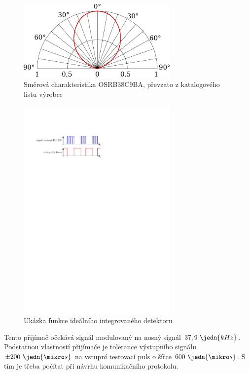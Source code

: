 \begin{figure}[H]
    \begin{center}
        \includegraphics[width=0.7\textwidth]{img/OSRB38C9BA-direction}
    \end{center}
    \caption{Směrová charakteristika OSRB38C9BA, převzato z katalogového listu výrobce}
\end{figure}

\begin{figure}[H]
    \begin{center}
        \includegraphics[width=0.7\textwidth]{img/funkce-ir-detektoru}
    \end{center}
    \caption{Ukázka funkce ideálního integrovaného detektoru}
\end{figure}

Tento přijímač očekává signál modulovaný na nosný signál $37,9~\jedn{kHz}$. Podstatnou vlastností přijímače je tolerance výstupního signálu $\pm 200~\jedn{\mikro s}$ na vstupní testovací puls o šířce $600~\jedn{\mikro s}$. S tím je třeba počítat při návrhu komunikačního protokolu.

